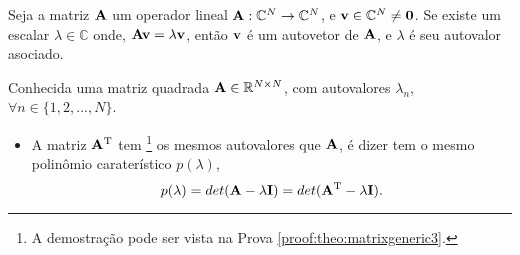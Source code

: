 \begin{definition}\label{def:matrixgeneric0}
Seja a matriz $\MATRIX{A}$ um operador lineal $\MATRIX{A}: \mathbb{C}^{N} \rightarrow \mathbb{C}^{N}$,  
e $\VECTOR{v} \in \mathbb{C}^{N} \neq\VECTOR{0}$. Se existe um escalar $\lambda \in \mathbb{C}$ onde, 
$\MATRIX{A}\VECTOR{v}=\lambda\VECTOR{v}$,
então $\VECTOR{v}$ é um autovetor de $\MATRIX{A}$, e $\lambda$ é seu autovalor asociado.
\end{definition}


\begin{theorem}\label{theo:matrixgeneric3}
Conhecida uma matriz quadrada $\MATRIX{A} \in \mathbb{R}^{N \times N}$, 
com  autovalores $\lambda_n$, $\forall n \in \{1, 2, ..., N\}$.
\begin{itemize}
\item A matriz $\MATRIX{A}^{\transpose}$ tem
\footnote{A demostração pode ser vista na Prova \ref{proof:theo:matrixgeneric3}.} 
os mesmos autovalores que $\MATRIX{A}$, é dizer tem o mesmo polinômio caraterístico $p(\lambda)$,
\begin{equation}
p(\lambda)=det(\MATRIX{A}-\lambda \MATRIX{I})=det(\MATRIX{A}^{\transpose}-\lambda \MATRIX{I}).
\end{equation}
\end{itemize}
\end{theorem}

